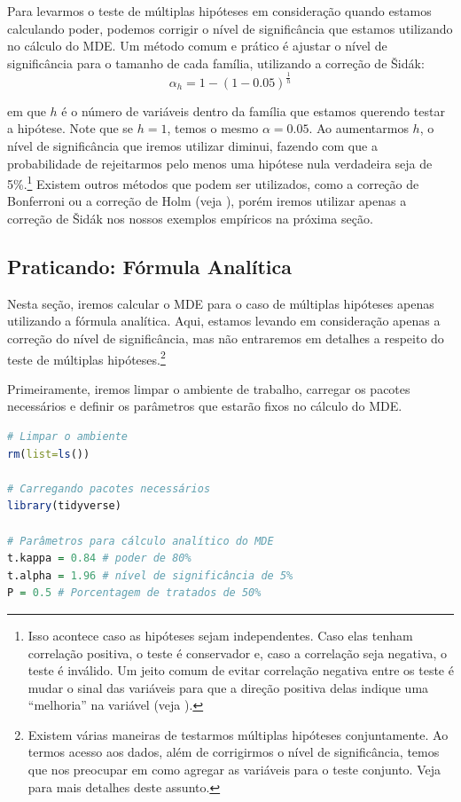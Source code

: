 Para levarmos o teste de múltiplas hipóteses em consideração quando estamos calculando poder, podemos corrigir o nível de significância que estamos utilizando no cálculo do MDE. Um método comum e prático é ajustar o nível de significância para o tamanho de cada família, utilizando a correção de \v{S}idák:
\begin{equation}
    \alpha_h = 1 - (1-0.05)^{\frac{1}{h}}
\end{equation}

\noindent em que $h$ é o número de variáveis dentro da família que estamos querendo testar a hipótese. Note que se $h = 1$, temos o mesmo $\alpha = 0.05$. Ao aumentarmos $h$, o nível de significância que iremos utilizar diminui, fazendo com que a probabilidade de rejeitarmos pelo menos uma hipótese nula verdadeira seja de 5\%.\footnote{Isso acontece caso as hipóteses sejam independentes. Caso elas tenham correlação positiva, o teste é conservador e, caso a correlação seja negativa, o teste é inválido. Um jeito comum de evitar correlação negativa entre os teste é mudar o sinal das variáveis para que a direção positiva delas indique uma ``melhoria'' na variável (veja \citealp{anderson2008}).} Existem outros métodos que podem ser utilizados, como a correção de Bonferroni ou a correção de Holm (veja \citealp{anderson2008}), porém iremos utilizar apenas a correção de \v{S}idák nos nossos exemplos empíricos na próxima seção.

\subsection{\sc Praticando: Fórmula Analítica}

Nesta seção, iremos calcular o MDE para o caso de múltiplas hipóteses apenas utilizando a fórmula analítica. Aqui, estamos levando em consideração apenas a correção do nível de significância, mas não entraremos em detalhes a respeito do teste de múltiplas hipóteses.\footnote{Existem várias maneiras de testarmos múltiplas hipóteses conjuntamente. Ao termos acesso aos dados, além de corrigirmos o nível de significância, temos que nos preocupar em como agregar as variáveis para o teste conjunto. Veja \cite{anderson2008} para mais detalhes deste assunto.}

Primeiramente, iremos limpar o ambiente de trabalho, carregar os pacotes necessários e definir os parâmetros que estarão fixos no cálculo do MDE.

\begin{boxH}
\begin{lstlisting}[language = R]
# Limpar o ambiente 
rm(list=ls())

# Carregando pacotes necessários
library(tidyverse)

# Parâmetros para cálculo analítico do MDE
t.kappa = 0.84 # poder de 80%
t.alpha = 1.96 # nível de significância de 5%
P = 0.5 # Porcentagem de tratados de 50%
\end{lstlisting}
\end{boxH}


